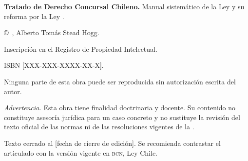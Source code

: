 \thispagestyle{empty}
\null\vfill
\noindent
{\footnotesize
\textbf{Tratado de Derecho Concursal Chileno.}
Manual sistemático de la Ley  y su reforma por la Ley .\par
\vspace{6pt}
\copyright\ \the\year, Alberto Tomás Stead Hogg.\par
Inscripción  en el Registro de Propiedad Intelectual.\par
ISBN [XXX-XXX-XXXX-XX-X].\par
\vspace{6pt}
Ninguna parte de esta obra puede ser reproducida sin autorización escrita del autor.\par
\vspace{10pt}
\textit{Advertencia.} Esta obra tiene finalidad doctrinaria y docente. Su contenido no
constituye asesoría jurídica para un caso concreto y no sustituye la revisión del texto
oficial de las normas ni de las resoluciones vigentes de la \Superir.\par
\vspace{6pt}
Texto cerrado al [fecha de cierre de edición]. Se recomienda contrastar el articulado
con la versión vigente en \textsc{bcn}, Ley Chile.\par
}
\vspace{1cm}
\cleardoublepage

